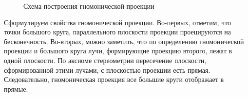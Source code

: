 \begin{wrapfigure}[9]{r}{0.43\tw}
    \centering
    \vspace{-0.8pc}
    \caption{Схема построения гномонической проекции}
    \label{pic:gnomonic-projection-schema} 
\end{wrapfigure}
Сформулируем свойства гномонической проекции. Во-первых, отметим, что точки большого круга, параллельного плоскости проекции проецируются на бесконечность. Во-вторых, можно заметить, что по определению гномонической проекции и большого круга лучи, формирующие проекцию второго, лежат в одной плоскости. По аксиоме стереометрии пересечение плоскости, сформированной этими лучами, с плоскостью проекции есть прямая. Следовательно, гномоническая проекция все большие круги отображает в прямые.

